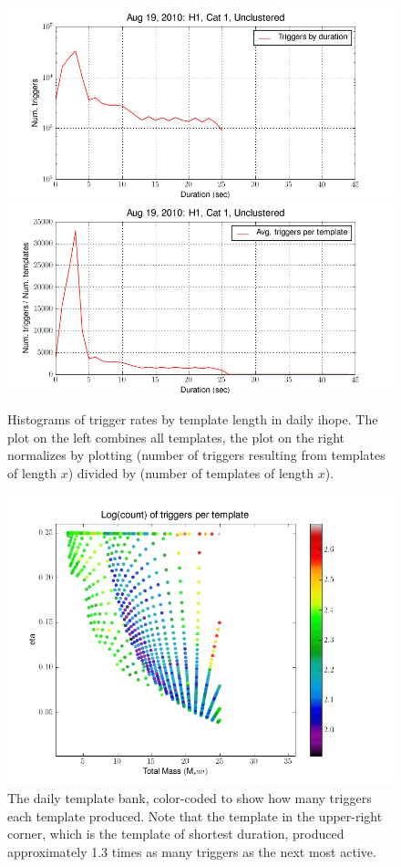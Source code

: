 \begin{figure}
  \includegraphics[width=0.5\linewidth]{figures/detchar/H1_1_UNCLUSTERED_mass_hist}
  \includegraphics[width=0.5\linewidth]{figures/detchar/H1_1_UNCLUSTERED_mass_hist_norm}
  \caption[Histograms of trigger rates by template length]{
  \label{f:daily_ihope_trig_histograms}
Histograms of trigger rates by template length in daily ihope.  The
plot on the left combines all templates, the plot on the right
normalizes by plotting (number of triggers resulting from templates of
length $x$) divided by (number of templates of length $x$).
}
\end{figure}%

\begin{figure}
  \includegraphics[width=\linewidth]{figures/detchar/H1_1_UNCLUSTERED_template_counts}
  \caption[Triggers per template]{
  \label{f:count_per_template}
The daily template bank, color-coded to show how many triggers each
template produced.  Note that the template in the upper-right corner,
which is the template of shortest duration, produced approximately 1.3
times as many triggers as the next most active.
}
\end{figure}%


